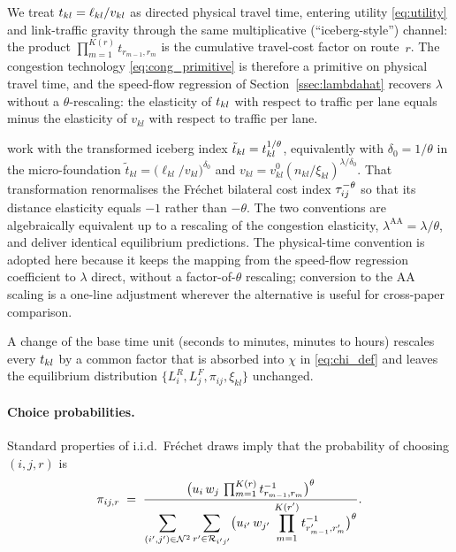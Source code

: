 \begin{remark}\label{rem:iceberg}
We treat $t_{kl}=\ell_{kl}/v_{kl}$ as directed physical travel time,
entering utility \eqref{eq:utility} and link-traffic gravity through
the same multiplicative (``iceberg-style'') channel: the product
$\prod_{m=1}^{K(r)}t_{r_{m-1},r_{m}}$ is the cumulative travel-cost
factor on route~$r$.  The congestion technology
\eqref{eq:cong_primitive} is therefore a primitive on physical travel
time, and the speed-flow regression of Section~\ref{ssec:lambdahat}
recovers $\lambda$ without a $\theta$-rescaling: the elasticity of
$t_{kl}$ with respect to traffic per lane equals minus the elasticity
of $v_{kl}$ with respect to traffic per lane.

\cite{AllenArkolakis2022} work with the transformed iceberg index
$\tilde t_{kl}=t_{kl}^{1/\theta}$, equivalently with $\delta_0=1/\theta$
in the micro-foundation
$\tilde t_{kl}=\bigl(\ell_{kl}/v_{kl}\bigr)^{\delta_0}$ and
$v_{kl}=v^{0}_{kl}(n_{kl}/\xi_{kl})^{\lambda/\delta_0}$.  That
transformation renormalises the Fr\'echet bilateral cost index
$\tau_{ij}^{-\theta}$ so that its distance elasticity equals $-1$ rather
than $-\theta$.  The two conventions are algebraically equivalent up
to a rescaling of the congestion elasticity,
$\lambda^{\mathrm{AA}}=\lambda/\theta$, and deliver identical
equilibrium predictions.  The physical-time convention is adopted
here because it keeps the mapping from the speed-flow regression
coefficient to $\lambda$ direct, without a factor-of-$\theta$
rescaling; conversion to the AA scaling is a one-line adjustment
wherever the alternative is useful for cross-paper comparison.

A change of the base time unit (seconds to minutes, minutes to
hours) rescales every $t_{kl}$ by a common factor that is absorbed
into $\chi$ in \eqref{eq:chi_def} and leaves the equilibrium
distribution $\{L_i^R,L_j^F,\pi_{ij},\xi_{kl}\}$ unchanged.
\end{remark}

\paragraph{Choice probabilities.}
Standard properties of i.i.d.\ Fr\'echet draws imply that the
probability of choosing $(i,j,r)$ is
\begin{equation}
  \pi_{ij,r}
  \;=\;
  \frac{
    \bigl(u_i\,w_j\,\prod_{m=1}^{K(r)} t_{r_{m-1},r_{m}}^{-1}\bigr)^{\theta}
  }{
    \displaystyle\sum_{(i',j')\in\mathcal N^{2}}
    \sum_{r'\in\mathcal R_{i'j'}}
    \bigl(u_{i'}\,w_{j'}\,\prod_{m=1}^{K(r')} t_{r'_{m-1},r'_{m}}^{-1}\bigr)^{\theta}
  }.
  \label{eq:routeprob}
\end{equation}

